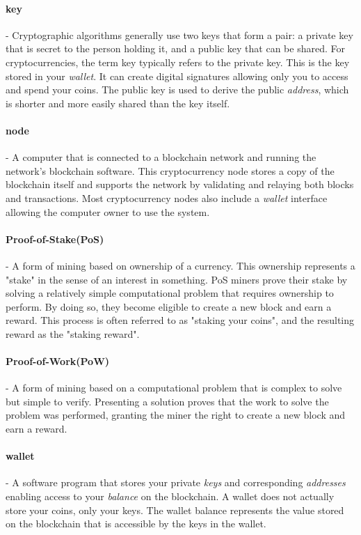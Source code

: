 \documentclass[11pt]{article}
\begin{document}
\paragraph{key}- Cryptographic algorithms generally use two keys that form a pair: a private key that is secret to the person holding it, and a public key that can be shared. For cryptocurrencies, the term key typically refers to the private key. This is the key stored in your \textit{wallet}. It can create digital signatures allowing only you to access and spend your coins. The public key is used to derive the public \textit{address}, which is shorter and more easily shared than the key itself.

\paragraph{node}- A computer that is connected to a blockchain network and running the network's blockchain software. This cryptocurrency node stores a copy of the blockchain itself and supports the network by validating and relaying both blocks and transactions. Most cryptocurrency nodes also include a \textit{wallet} interface allowing the computer owner to use the system.

\paragraph{Proof-of-Stake(PoS)}- A form of mining based on ownership of a currency. This ownership represents a "stake" in the sense of an interest in something. PoS miners prove their stake by solving a relatively simple computational problem that requires ownership to perform. By doing so, they become eligible to create a new block and earn a reward. This process is often referred to as "staking your coins", and the resulting reward as the "staking reward".

\paragraph{Proof-of-Work(PoW)}- A form of mining based on a computational problem that is complex to solve but simple to verify. Presenting a solution proves that the work to solve the problem was performed, granting the miner the right to create a new block and earn a reward. 

\paragraph{wallet}- A software program that stores your private \textit{keys} and corresponding \textit{addresses} enabling access to your \textit{balance} on the blockchain. A wallet does not actually store your coins, only your keys. The wallet balance represents the value stored on the blockchain that is accessible by the keys in the wallet.
\end{document}
